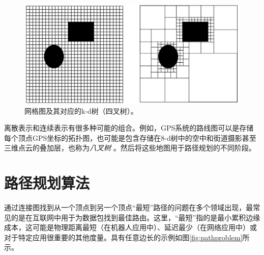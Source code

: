 \begin{figure}
\centering
\includegraphics[width=\textwidth]{figs/gridvskdtree.png}
\caption{网格图及其对应的k-d树（四叉树）。}
\label{fig:gridvskdtree}
\end{figure}



离散表示和连续表示有很多种可能的组合。例如，GPS系统的路线图可以是存储每个顶点GPS坐标的拓扑图，也可能是包含存储在8-d树中的空中和街道摄影甚至三维点云的叠加层，也称为\emph{八叉树} 。然后将这些地图用于路径规划的不同阶段。



\section{路径规划算法}
通过连接图找到从一个顶点到另一个顶点“最短”路径的问题在多个领域出现，最常见的是在互联网中用于为数据包找到最佳路由。这里，“最短”指的是最小累积边缘成本，这可能是物理距离最短（在机器人应用中）、延迟最少（在网络应用中）或对于特定应用很重要的其他度量。具有任意边长的示例如图\ref{fig:pathproblem}所示。

